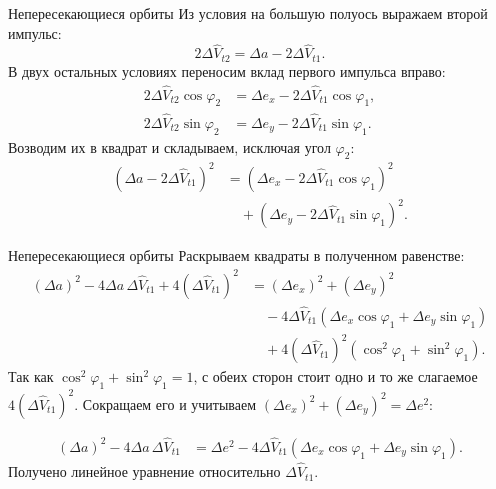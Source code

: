 \documentclass[11pt,aspectratio=169,t]{beamer}
\newcommand{\derivationmathspacing}{%
  \setlength{\abovedisplayskip}{2pt}%
  \setlength{\belowdisplayskip}{3pt}%
  \setlength{\abovedisplayshortskip}{2pt}%
  \setlength{\belowdisplayshortskip}{2pt}%
  \setlength{\jot}{2pt}}
\begin{document}
\begin{frame}{Непересекающиеся орбиты}
\relax
\derivationmathspacing
Из условия на большую полуось выражаем второй импульс:
\[
 2\Delta\widehat V_{t2}=\Delta a-2\Delta\widehat V_{t1}.
\]
В двух остальных условиях переносим вклад первого импульса вправо:
\[
\begin{aligned}
 2\Delta\widehat V_{t2}\cos\varphi_2
   &=\Delta e_x-2\Delta\widehat V_{t1}\cos\varphi_1,\\
 2\Delta\widehat V_{t2}\sin\varphi_2
   &=\Delta e_y-2\Delta\widehat V_{t1}\sin\varphi_1.
\end{aligned}
\]
Возводим их в квадрат и складываем, исключая угол $\varphi_2$:
\[
\begin{aligned}
 (\Delta a-2\Delta\widehat V_{t1})^2
   &=(\Delta e_x-2\Delta\widehat V_{t1}\cos\varphi_1)^2\\
   &\quad +(\Delta e_y-2\Delta\widehat V_{t1}\sin\varphi_1)^2.
\end{aligned}
\]
\end{frame}

\begin{frame}{Непересекающиеся орбиты}
\relax
\derivationmathspacing
Раскрываем квадраты в полученном равенстве:
\[
\begin{aligned}
 (\Delta a)^2-4\Delta a\,\Delta\widehat V_{t1}
       +4(\Delta\widehat V_{t1})^2
   &=(\Delta e_x)^2+(\Delta e_y)^2\\
   &\quad-4\Delta\widehat V_{t1}
       (\Delta e_x\cos\varphi_1+\Delta e_y\sin\varphi_1)\\
   &\quad+4(\Delta\widehat V_{t1})^2
       (\cos^2\varphi_1+\sin^2\varphi_1).
\end{aligned}
\]
\justifying
Так как $\cos^2\varphi_1+\sin^2\varphi_1=1$, с обеих сторон
стоит одно и то же слагаемое $4(\Delta\widehat V_{t1})^2$.
Сокращаем его и учитываем $(\Delta e_x)^2+(\Delta e_y)^2=\Delta e^2$:
\par
\[
\begin{aligned}
 (\Delta a)^2-4\Delta a\,\Delta\widehat V_{t1}
   &=\Delta e^2-4\Delta\widehat V_{t1}
        (\Delta e_x\cos\varphi_1+\Delta e_y\sin\varphi_1).
\end{aligned}
\]
Получено линейное уравнение относительно $\Delta\widehat V_{t1}$.
\end{frame}
\end{document}
